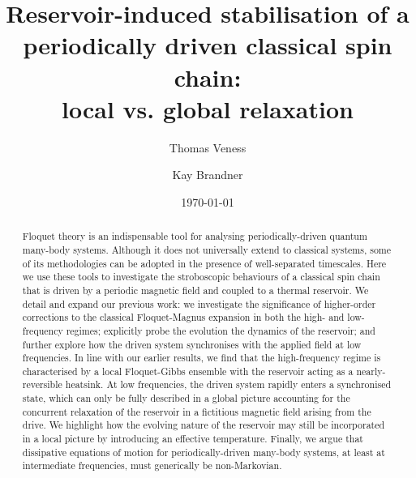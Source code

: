 \documentclass[aps,pre,twocolumn,notitlepage,floats,10pt]{revtex4-1}
\begin{document}
\title{Reservoir-induced stabilisation of a periodically driven classical spin
  chain:\\ local vs. global relaxation}
\date{\today}
\author{Thomas Veness}
\author{Kay Brandner}
\begin{abstract}
Floquet theory is an indispensable tool for analysing periodically-driven
quantum many-body systems. 
Although it does not universally extend to classical systems, some of its
methodologies can be adopted in the presence of well-separated timescales.
Here we use these tools to investigate the stroboscopic behaviours of a
classical spin chain that is driven by a periodic magnetic field and coupled to
a thermal reservoir. 
We detail and expand our previous work: 
we investigate the significance of higher-order corrections to the classical
Floquet-Magnus expansion in both the high- and low-frequency regimes;
explicitly probe the evolution the dynamics of the reservoir;
and further explore how the driven system synchronises with the applied field
at low frequencies.
In line with our earlier results, we find that the high-frequency regime is
characterised by a local Floquet-Gibbs ensemble with the reservoir acting as a
nearly-reversible heatsink.
At low frequencies, the driven system rapidly enters a synchronised state, which
can only be fully described in a global picture accounting for the concurrent
relaxation of the reservoir in a fictitious magnetic field arising from the
drive.
We highlight how the evolving nature of the reservoir may still be incorporated
in a local picture by introducing an effective temperature.
Finally, we argue that dissipative equations of motion for periodically-driven
many-body systems, at least at intermediate frequencies, must generically be
non-Markovian.
\end{abstract}

\maketitle
\end{document}
